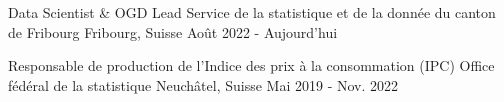 
\begin{cventries}
  \cventry
    {Data Scientist \& OGD Lead}
    {Service de la statistique et de la donnée du canton de Fribourg}
    {Fribourg, Suisse}
    {Août 2022 - Aujourd'hui}
    {
      \begin{cvitems}
        \item {\ExpCurrentPortalFr}
        \item {\ExpCurrentPipelineFr}
        \item {\ExpCurrentGovernanceFr}
        \item {\ExpCurrentLeadershipFr}
      \end{cvitems}
    }

  \cventry
    {Responsable de production de l'Indice des prix à la consommation (IPC)}
    {Office fédéral de la statistique}
    {Neuchâtel, Suisse}
    {Mai 2019 - Nov. 2022}
    {
      \begin{cvitems}
        \item {\ExpCpiProcessingFr}
        \item {\ExpCpiModelingFr}
        \item {\ExpCpiQualityFr}
        \item {\ExpCpiLeadershipFr}
      \end{cvitems}
    }
\end{cventries}
